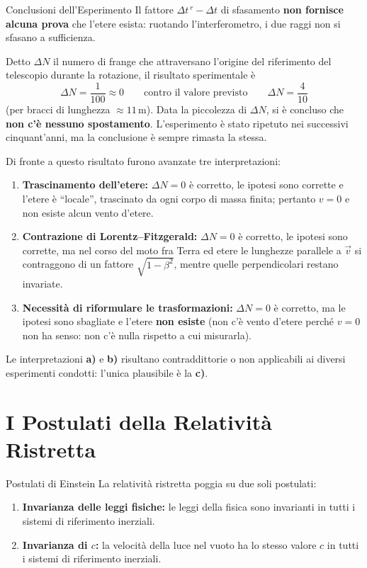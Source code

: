 \begin{osservazione}{Conclusioni dell'Esperimento}
Il fattore $\Delta t^{\,r} - \Delta t$ di sfasamento \textbf{non fornisce alcuna prova} che l'etere esista: ruotando l'interferometro, i due raggi non si sfasano a sufficienza.

Detto $\Delta N$ il numero di frange che attraversano l'origine del riferimento del telescopio durante la rotazione, il risultato sperimentale è
\begin{equation*}
    \Delta N = \frac{1}{100} \approx 0
    \qquad \text{contro il valore previsto} \qquad
    \Delta N = \frac{4}{10}
\end{equation*}
(per bracci di lunghezza $\approx 11 \, \mathrm{m}$). Data la piccolezza di $\Delta N$, si è concluso che \textbf{non c'è nessuno spostamento}. L'esperimento è stato ripetuto nei successivi cinquant'anni, ma la conclusione è sempre rimasta la stessa.
\end{osservazione}

Di fronte a questo risultato furono avanzate tre interpretazioni:
\begin{enumerate}[label=\textbf{\alph*)}]
    \item \textbf{Trascinamento dell'etere:} $\Delta N = 0$ è corretto, le ipotesi sono corrette e l'etere è ``locale'', trascinato da ogni corpo di massa finita; pertanto $v = 0$ e non esiste alcun vento d'etere.
    \item \textbf{Contrazione di Lorentz--Fitzgerald:} $\Delta N = 0$ è corretto, le ipotesi sono corrette, ma nel corso del moto fra Terra ed etere le lunghezze parallele a $\vec{v}$ si contraggono di un fattore $\sqrt{1-\beta^2}$, mentre quelle perpendicolari restano invariate.
    \item \textbf{Necessità di riformulare le trasformazioni:} $\Delta N = 0$ è corretto, ma le ipotesi sono sbagliate e l'etere \textbf{non esiste} (non c'è vento d'etere perché $v=0$ non ha senso: non c'è nulla rispetto a cui misurarla).
\end{enumerate}

Le interpretazioni \textbf{a)} e \textbf{b)} risultano contraddittorie o non applicabili ai diversi esperimenti condotti: l'unica plausibile è la \textbf{c)}.

\section{I Postulati della Relatività Ristretta}

\begin{teorema}{Postulati di Einstein}
La relatività ristretta poggia su due soli postulati:
\begin{enumerate}
    \item \textbf{Invarianza delle leggi fisiche:} le leggi della fisica sono invarianti in tutti i sistemi di riferimento inerziali.
    \item \textbf{Invarianza di $c$:} la velocità della luce nel vuoto ha lo stesso valore $c$ in tutti i sistemi di riferimento inerziali.
\end{enumerate}
\end{teorema}

